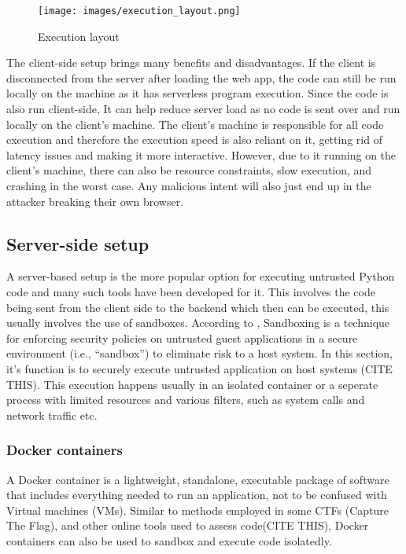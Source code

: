\begin{figure}[H]
    \centering
    \texttt{[image: images/execution\_layout.png]}
    \caption{Execution layout}
    \label{fig:execution layout}
\end{figure}

The client-side setup brings many benefits and disadvantages. If the client is disconnected from the server after loading the web app, the code can still be run locally on the machine as it has serverless program execution. Since the code is also run client-side, It can help reduce server load as no code is sent over and run locally on the client's machine. The client's machine is responsible for all code execution and therefore the execution speed is also reliant on it, getting rid of latency issues and making it more interactive. However, due to it running on the client's machine, there can also be resource constraints, slow execution, and crashing in the worst case. Any malicious intent will also just end up in the attacker breaking their own browser.

\subsection{Server-side setup}
A server-based setup is the more popular option for executing untrusted Python code and many such tools have been developed for it. This involves the code being sent from the client side to the backend which then can be executed, this usually involves the use of sandboxes. According to \cite{stephens2024sandbox}, Sandboxing is a technique for enforcing security policies on untrusted guest applications in a secure environment (i.e., “sandbox”) to eliminate risk to a host system. In this section, it's function is to securely execute untrusted application on host systems (CITE THIS). This execution happens usually in an isolated container or a seperate process with limited resources and various filters, such as system calls and network traffic etc.

\subsubsection{Docker containers}
A Docker container is a lightweight, standalone, executable package of software that includes everything needed to run an application, not to be confused with Virtual machines (VMs). Similar to methods employed in some CTFs (Capture The Flag), and other online tools used to assess code(CITE THIS), Docker containers can also be used to sandbox and execute code isolatedly.

